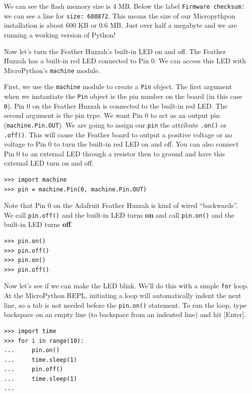 \documentclass{book}
\begin{document}
We can see the flash memory size is 4 MB. Below the label
\lstinline!Firmware checksum:! we can see a line for
\lstinline!size: 600872!. This means the size of our Micropythpon
installation is about 600 KB or 0.6 MB. Just over half a megabyte and we
are running a working version of Python!

Now let's turn the Feather Huzzah's built-in LED on and off. The Feather
Huzzah has a built-in red LED connected to Pin 0. We can access this LED
with MicroPython's \lstinline!machine! module.

First, we use the \lstinline!machine! module to create a \lstinline!Pin!
object. The first argument when we instantiate the \lstinline!Pin!
object is the pin number on the board (in this case \lstinline!0!). Pin
0 on the Feather Huzzah is connected to the built-in red LED. The second
argument is the pin type. We want Pin 0 to act as an output pin
(\lstinline!machine.Pin.OUT!). We are going to assign our
\lstinline!pin! the attribute \lstinline!.on()! or \lstinline!.off()!.
This will cause the Feather board to output a positive voltage or no
voltage to Pin 0 to turn the built-in red LED on and off. You can also
connect Pin 0 to an external LED through a resistor then to ground and
have this external LED turn on and off.

\begin{lstlisting}
>>> import machine
>>> pin = machine.Pin(0, machine.Pin.OUT)
\end{lstlisting}

Note that Pin 0 on the Adafruit Feather Huzzah is kind of wired
``backwards''. We call \lstinline!pin.off()! and the built-in LED turns
\textbf{on} and call \lstinline!pin.on()! and the built-in LED turns
\textbf{off}.

\begin{lstlisting}
>>> pin.on()
>>> pin.off()
>>> pin.on()
>>> pin.off()
\end{lstlisting}

Now let's see if we can make the LED blink. We'll do this with a simple
\lstinline!for! loop. At the MicroPython REPL, initiating a loop will
automatically indent the next line, so a tab is not needed before the
\lstinline!pin.on()! statement. To run the loop, type backspace on an
empty line (to backspace from an indented line) and hit {[}Enter{]}.

\begin{lstlisting}
>>> import time
>>> for i in range(10):
...     pin.on()
...     time.sleep(1)
...     pin.off()
...     time.sleep(1)
...
\end{lstlisting}
\end{document}
